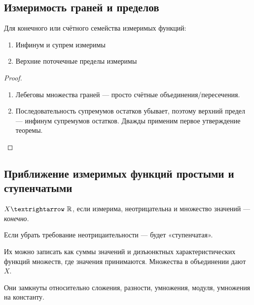 \documentclass[12pt, a4paper, oneside]{memoir}
\begin{document}
\subsection{Измеримость граней и пределов}

\begin{theorem}

    Для конечного или счётного семейства измеримых функций:
    
    \begin{enumerate}
        \item Инфинум и супрем измеримы
        \item Верхние поточечные пределы измеримы
    \end{enumerate}

    \begin{proof}
        \begin{enumerate}
            \item Лебеговы множества граней — просто счётные объединения/пересечения.
            \item Последовательность супремумов остатков убывает, поэтому верхний предел — инфинум супремумов остатков.
            Дважды применим первое утверждение теоремы.
        \end{enumerate}
    \end{proof}
\end{theorem}



\subsection{Приближение измеримых функций простыми и ступенчатыми}

\begin{definition}

    $X → \sR$, если измерима, неотрицательна и множество значений — \textit{конечно}.
\end{definition}

Если убрать требование неотрицаительности — будет «ступенчатая».

Их можно записать как суммы значений и 
дизъюнктных характеристических функций множеств, где значения принимаются.
Множества в объединении дают $X$.

\begin{remark}
    Они замкнуты относительно сложения, разности, умножения, модуля, умножения на константу.
\end{remark}
\end{document}
